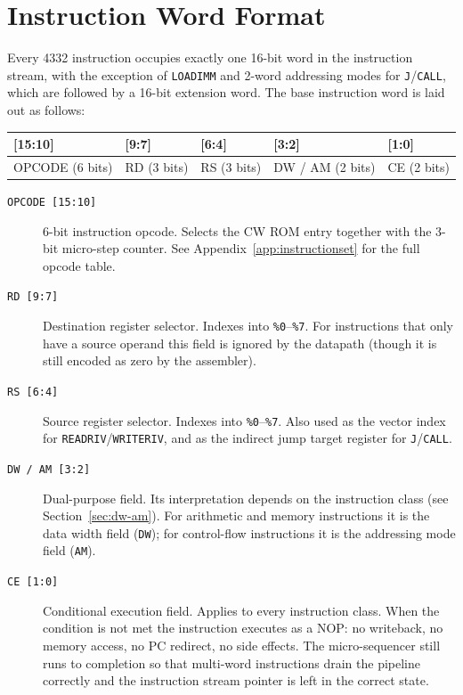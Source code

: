 \documentclass[a4paper,12pt]{report}
\newcommand{\asm}[1]{\texttt{#1}}
\newcommand{\field}[1]{\texttt{\small #1}}
\newcommand{\reg}[1]{\texttt{\%#1}}
\begin{document}
\section{Instruction Word Format}
\label{sec:encoding}

Every 4332 instruction occupies exactly one 16-bit word in the instruction stream, with the exception of \asm{LOADIMM} and 2-word addressing modes for \asm{J}/\asm{CALL}, which are followed by a 16-bit extension word. The base instruction word is laid out as follows:

\vspace{0.5em}
\begin{center}
\begin{tabular}{|p{2.2cm}|p{1.5cm}|p{1.5cm}|p{2cm}|p{2cm}|}
    \hline
    \textbf{[15:10]} & \textbf{[9:7]} & \textbf{[6:4]} & \textbf{[3:2]} & \textbf{[1:0]} \\
    \hline
    OPCODE (6 bits) & RD (3 bits) & RS (3 bits) & DW / AM (2 bits) & CE (2 bits) \\
    \hline
\end{tabular}
\end{center}
\vspace{0.5em}

\begin{description}
    \item[\field{OPCODE [15:10]}]
        6-bit instruction opcode. Selects the CW ROM entry together with the 3-bit micro-step counter. See Appendix~\ref{app:instructionset} for the full opcode table.

    \item[\field{RD [9:7]}]
        Destination register selector. Indexes into \reg{0}--\reg{7}. For instructions that only have a source operand this field is ignored by the datapath (though it is still encoded as zero by the assembler).

    \item[\field{RS [6:4]}]
        Source register selector. Indexes into \reg{0}--\reg{7}. Also used as the vector index for \asm{READRIV}/\asm{WRITERIV}, and as the indirect jump target register for \asm{J}/\asm{CALL}.

    \item[\field{DW / AM [3:2]}]
        Dual-purpose field. Its interpretation depends on the instruction class (see Section~\ref{sec:dw-am}). For arithmetic and memory instructions it is the data width field (\field{DW}); for control-flow instructions it is the addressing mode field (\field{AM}).

    \item[\field{CE [1:0]}]
        Conditional execution field. Applies to every instruction class. When the condition is not met the instruction executes as a NOP: no writeback, no memory access, no PC redirect, no side effects. The micro-sequencer still runs to completion so that multi-word instructions drain the pipeline correctly and the instruction stream pointer is left in the correct state.
\end{description}
\end{document}
